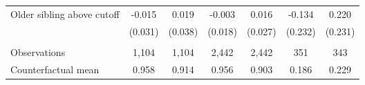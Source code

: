 {{\begin{tabular}{lcccccc}
Older sibling above cutoff&      -0.015   &       0.019   &      -0.003   &       0.016   &      -0.134   &       0.220   \\
                    &     (0.031)   &     (0.038)   &     (0.018)   &     (0.027)   &     (0.232)   &     (0.231)   \\
                    &               &               &               &               &               &               \\
Observations        &       1,104   &       1,104   &       2,442   &       2,442   &         351   &         343   \\
Counterfactual mean &       0.958   &       0.914   &       0.956   &       0.903   &       0.186   &       0.229   \\
 

\bottomrule
\end{tabular}
}
}

